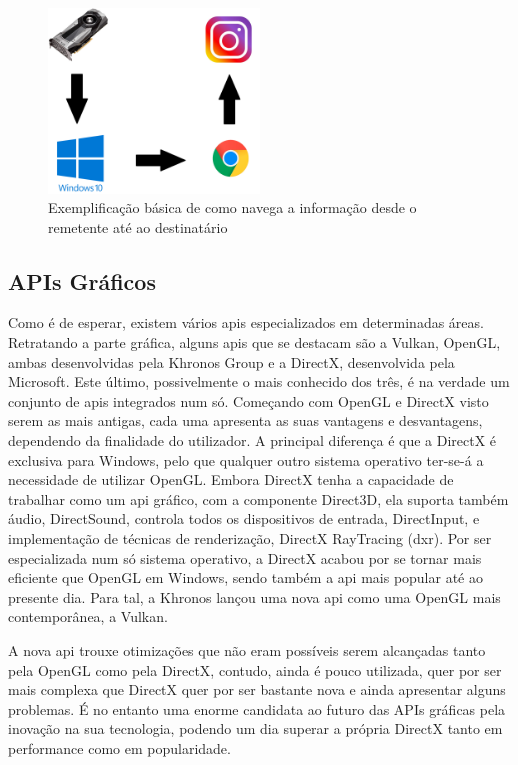 \documentclass{report}
\begin{document}
\begin{figure}[h]
\centering
\includegraphics[width=0.5\textwidth]{api.png}
\caption{Exemplificação básica de como navega a informação desde o remetente até ao destinatário}
\label{fig:api}
\end{figure}

\subsection{APIs Gráficos} Como é de esperar, existem vários \acs{api}s especializados em determinadas áreas. Retratando a parte gráfica, alguns \acs{api}s que se destacam são a Vulkan, OpenGL, ambas desenvolvidas pela Khronos Group e a DirectX, desenvolvida pela Microsoft. Este último, possivelmente o mais conhecido dos três, é na verdade um conjunto de \acs{api}s integrados num só. \newline
Começando com OpenGL e DirectX visto serem as mais antigas, cada uma apresenta as suas vantagens e desvantagens, dependendo da finalidade do utilizador. A principal diferença é que a DirectX é exclusiva para Windows, pelo que qualquer outro sistema operativo ter-se-á a necessidade de utilizar OpenGL. Embora DirectX tenha a capacidade de trabalhar como um \acs{api} gráfico, com a componente Direct3D, ela suporta também áudio, DirectSound, controla todos os dispositivos de entrada, DirectInput, e implementação de técnicas de renderização, DirectX RayTracing (\acs{dxr}). \newline
Por ser especializada num só sistema operativo, a DirectX acabou por se tornar mais eficiente que OpenGL em Windows, sendo também a \acs{api} mais popular até ao presente dia. Para tal, a Khronos lançou uma nova \acs{api} como uma OpenGL mais contemporânea, a Vulkan.

\vspace{2cm} A nova \acs{api} trouxe otimizações que não eram possíveis serem alcançadas tanto pela OpenGL como pela DirectX, contudo, ainda é pouco utilizada, quer por ser mais complexa que DirectX quer por ser bastante nova e ainda apresentar alguns problemas. É no entanto uma enorme candidata ao futuro das APIs gráficas pela inovação na sua tecnologia, podendo um dia superar a própria DirectX tanto em performance como em popularidade.
\end{document}

